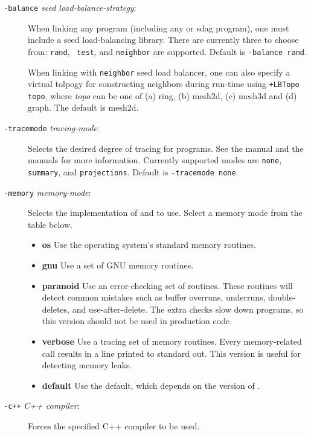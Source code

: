 \begin{description}
\item[{\tt -balance} {\em seed load-balance-strategy}:]

When linking any \converse{} program (including any \charmpp{} or sdag program),
one must include a seed load-balancing
library.  There are currently three to choose from: {\tt rand}, {\tt
test}, and {\tt neighbor} are supported.  Default is {\tt -balance rand}.

When linking with {\tt neighbor} seed load balancer, one can also specify
a virtual tolpogy for constructing neighbors during run-time using 
{\tt +LBTopo topo}, where {\em topo} can be one of (a) ring, (b) mesh2d,
(c) mesh3d and (d) graph. The default is mesh2d.

\item[{\tt -tracemode} {\em tracing-mode}:]

Selects the desired degree of tracing for \charmpp{} programs.
See the \charmpp{} manual and the \projections{} manuals for
more information.  Currently supported modes are {\tt none}, {\tt
summary}, and {\tt projections}. Default is {\tt -tracemode none}.


\item[{\tt -memory} {\em memory-mode}:]
Selects the implementation of  and 
to use.  Select a memory mode from the table below.

\begin{itemize}
\item{{\bf os} Use the operating system's standard memory routines.}
\item{{\bf gnu} Use a set of GNU memory routines.}
\item{{\bf paranoid} Use an error-checking set of routines.
These routines will detect common mistakes such as buffer
overruns, underruns, double-deletes, and use-after-delete.
The extra checks slow down programs, so this version should
not be used in production code.}
\item{{\bf verbose} Use a tracing set of memory routines.
Every memory-related call results in a line printed to 
standard out. This version is useful for detecting memory leaks.}
\item{{\bf default} Use the default, which depends on the version of \charmpp.}
\end{itemize}


\item[{\tt -c++} {\em C++ compiler}:]

Forces the specified C++ compiler to be used.


\end{description}
